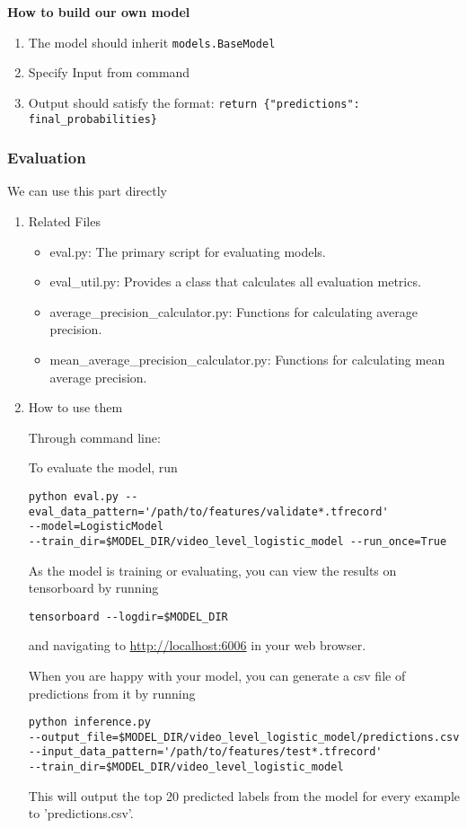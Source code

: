 \documentclass[11pt]{article}
\begin{document}
\begin{enumerate}
\textbf{How to build our own model}

\begin{enumerate}
\item The model should inherit \texttt{models.BaseModel}
\item Specify Input from command
\item Output should satisfy the format: \texttt{return \{"predictions": final\_probabilities\}}
\end{enumerate}
\end{enumerate}



\subsubsection{Evaluation}
\label{sec:org3ca2c3b}
We can use this part directly
\begin{enumerate}
\item Related Files
\label{sec:orgdd4010f}
\begin{itemize}
\item eval.py: The primary script for evaluating models.
\item eval\_util.py: Provides a class that calculates all evaluation metrics.
\item average\_precision\_calculator.py: Functions for calculating average precision.
\item mean\_average\_precision\_calculator.py: Functions for calculating mean average precision.
\end{itemize}

\item How to use them
\label{sec:org6f76e5f}

Through command line:

To evaluate the model, run

\begin{verbatim}
python eval.py --eval_data_pattern='/path/to/features/validate*.tfrecord'
--model=LogisticModel
--train_dir=$MODEL_DIR/video_level_logistic_model --run_once=True
\end{verbatim}

As the model is training or evaluating, you can view the results on tensorboard by running

\begin{verbatim}
tensorboard --logdir=$MODEL_DIR
\end{verbatim}

and navigating to \url{http://localhost:6006} in your web browser.

When you are happy with your model, you can generate a csv file of predictions from it by running
\begin{verbatim}
python inference.py
--output_file=$MODEL_DIR/video_level_logistic_model/predictions.csv
--input_data_pattern='/path/to/features/test*.tfrecord'
--train_dir=$MODEL_DIR/video_level_logistic_model
\end{verbatim}
This will output the top 20 predicted labels from the model for every example to 'predictions.csv'.
\end{enumerate}
\end{document}
